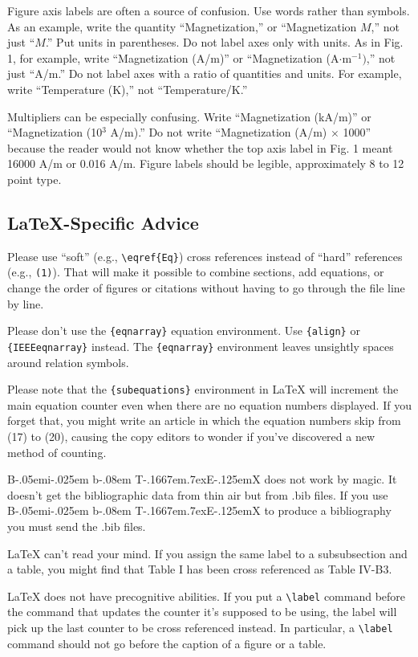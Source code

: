 \documentclass[transmag, onecolumn]{IEEEtran}
\def\BibTeX{{\rm B\kern-.05em{\sc i\kern-.025em b}\kern-.08em T\kern-.1667em\lower.7ex\hbox{E}\kern-.125emX}}
\begin{document}
Figure axis labels are often a source of confusion. Use words rather than 
symbols. As an example, write the quantity ``Magnetization,'' or 
``Magnetization $M$,'' not just ``$M$.'' Put units in parentheses. Do not label 
axes only with units. As in Fig. 1, for example, write ``Magnetization 
(A/m)'' or ``Magnetization (A$\cdot $m$^{-1})$,'' not just ``A/m.'' Do not 
label axes with a ratio of quantities and units. For example, write 
``Temperature (K),'' not ``Temperature/K.'' 

Multipliers can be especially confusing. Write ``Magnetization (kA/m)'' or 
``Magnetization (10$^{3}$ A/m).'' Do not write ``Magnetization (A/m) 
$\times$ 1000'' because the reader would not know whether the top axis 
label in Fig. 1 meant 16000 A/m or 0.016 A/m. Figure labels should be 
legible, approximately 8 to 12 point type.

\subsection{\LaTeX-Specific Advice}

Please use ``soft'' (e.g., \verb|\eqref{Eq}|) cross references instead
of ``hard'' references (e.g., \verb|(1)|). That will make it possible
to combine sections, add equations, or change the order of figures or
citations without having to go through the file line by line.

Please don't use the \verb|{eqnarray}| equation environment. Use
\verb|{align}| or \verb|{IEEEeqnarray}| instead. The \verb|{eqnarray}|
environment leaves unsightly spaces around relation symbols.

Please note that the \verb|{subequations}| environment in {\LaTeX}
will increment the main equation counter even when there are no
equation numbers displayed. If you forget that, you might write an
article in which the equation numbers skip from (17) to (20), causing
the copy editors to wonder if you've discovered a new method of
counting.

{\BibTeX} does not work by magic. It doesn't get the bibliographic
data from thin air but from .bib files. If you use {\BibTeX} to produce a
bibliography you must send the .bib files. 

{\LaTeX} can't read your mind. If you assign the same label to a
subsubsection and a table, you might find that Table I has been cross
referenced as Table IV-B3. 

{\LaTeX} does not have precognitive abilities. If you put a
\verb|\label| command before the command that updates the counter it's
supposed to be using, the label will pick up the last counter to be
cross referenced instead. In particular, a \verb|\label| command
should not go before the caption of a figure or a table.
\end{document}
